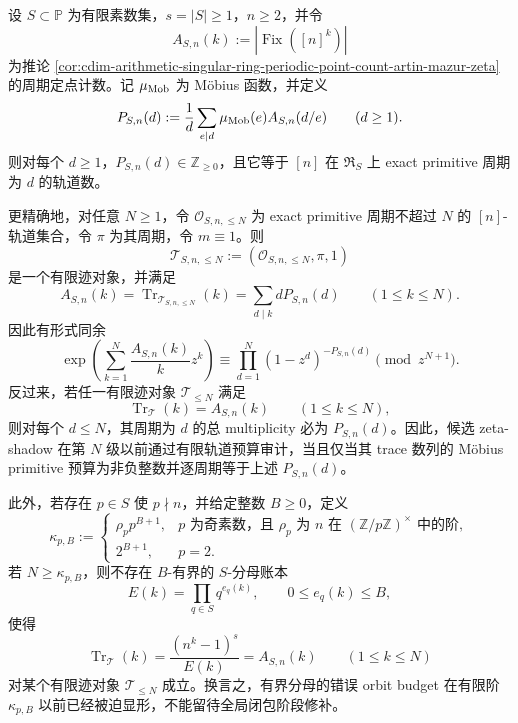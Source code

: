 \begin{theorem}\label{distill:connes_consani_arithmetic_site-zeta_shadow_periodic_count_templates-finite-trace-primitive-budget-gate}
设 \(S\subset\mathbb P\) 为有限素数集，\(s=|S|\ge1\)，\(n\ge2\)，并令
\[
A_{S,n}(k):=|\operatorname{Fix}([n]^k)|
\]
为推论 \ref{cor:cdim-arithmetic-singular-ring-periodic-point-count-artin-mazur-zeta} 的周期定点计数。记 \(\mu_{\rm Mob}\) 为 Möbius 函数，并定义
\[
P_{S,n}(d):=\frac1d\sum_{e\mid d}\mu_{\rm Mob}(e)A_{S,n}(d/e)
\qquad(d\ge1).
\]
则对每个 \(d\ge1\)，\(P_{S,n}(d)\in\mathbb Z_{\ge0}\)，且它等于 \([n]\) 在 \(\mathfrak R_S\) 上 exact primitive 周期为 \(d\) 的轨道数。

更精确地，对任意 \(N\ge1\)，令 \(\mathcal O_{S,n,\le N}\) 为 exact primitive 周期不超过 \(N\) 的 \([n]\)-轨道集合，令 \(\pi\) 为其周期，令 \(m\equiv1\)。则
\[
\mathcal T_{S,n,\le N}:=(\mathcal O_{S,n,\le N},\pi,1)
\]
是一个有限迹对象，并满足
\[
A_{S,n}(k)=\operatorname{Tr}_{\mathcal T_{S,n,\le N}}(k)
=\sum_{d\mid k}dP_{S,n}(d)
\qquad(1\le k\le N).
\]
因此有形式同余
\[
\exp\!\left(\sum_{k=1}^{N}\frac{A_{S,n}(k)}kz^k\right)
\equiv
\prod_{d=1}^{N}(1-z^d)^{-P_{S,n}(d)}
\pmod{z^{N+1}}.
\]
反过来，若任一有限迹对象 \(\mathcal T_{\le N}\) 满足
\[
\operatorname{Tr}_{\mathcal T}(k)=A_{S,n}(k)\qquad(1\le k\le N),
\]
则对每个 \(d\le N\)，其周期为 \(d\) 的总 multiplicity 必为 \(P_{S,n}(d)\)。因此，候选 zeta-shadow 在第 \(N\) 级以前通过有限轨道预算审计，当且仅当其 trace 数列的 Möbius primitive 预算为非负整数并逐周期等于上述 \(P_{S,n}(d)\)。

此外，若存在 \(p\in S\) 使 \(p\nmid n\)，并给定整数 \(B\ge0\)，定义
\[
\kappa_{p,B}:=
\begin{cases}
\rho_p p^{B+1},& p\text{ 为奇素数，且 }\rho_p\text{ 为 }n\text{ 在 }(\mathbb Z/p\mathbb Z)^\times\text{ 中的阶},\\
2^{B+1},& p=2.
\end{cases}
\]
若 \(N\ge\kappa_{p,B}\)，则不存在 \(B\)-有界的 \(S\)-分母账本
\[
E(k)=\prod_{q\in S}q^{e_q(k)},\qquad 0\le e_q(k)\le B,
\]
使得
\[
\operatorname{Tr}_{\mathcal T}(k)=\frac{(n^k-1)^s}{E(k)}=A_{S,n}(k)
\qquad(1\le k\le N)
\]
对某个有限迹对象 \(\mathcal T_{\le N}\) 成立。换言之，有界分母的错误 orbit budget 在有限阶 \(\kappa_{p,B}\) 以前已经被迫显形，不能留待全局闭包阶段修补。
\end{theorem}
